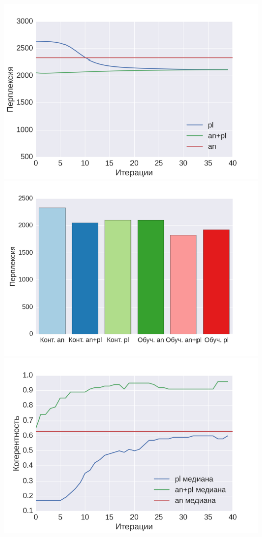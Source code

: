 \documentclass[a4paper, 14pt]{extarticle}
\begin{document}
\includegraphics[scale=0.43]{img/anpl/1}  
\includegraphics[scale=0.43]{img/anpl/5}
\includegraphics[scale=0.43]{img/anpl/3}
\end{document}
